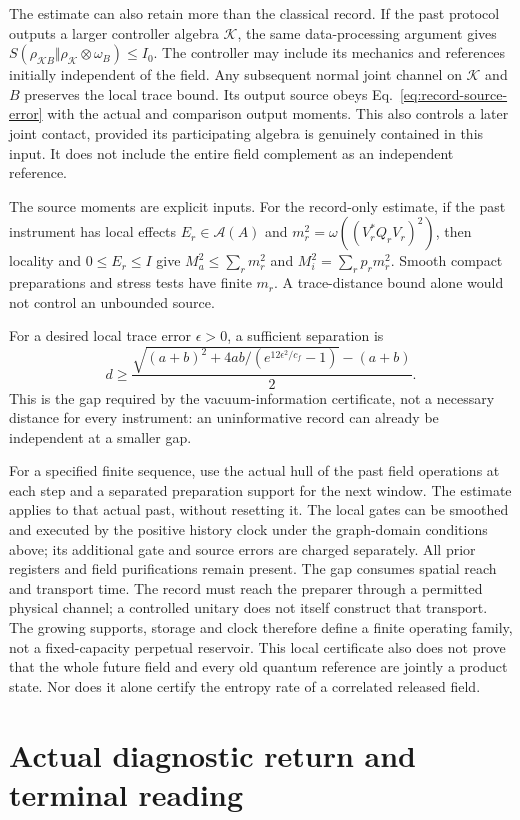 The estimate can also retain more than the classical record. If the past
protocol outputs a larger controller algebra $\mathcal K$, the same
data-processing argument gives
$S(\rho_{\mathcal KB}\Vert\rho_{\mathcal K}\otimes\omega_B)\le I_0$.
The controller may include its mechanics and references initially
independent of the field. Any subsequent normal joint channel on
$\mathcal K$ and $B$ preserves the local trace bound. Its output
source obeys Eq.~\eqref{eq:record-source-error} with the actual and
comparison output moments. This also controls a later joint contact,
provided its participating algebra is genuinely contained in this
input. It does not include the entire field complement as an
independent reference.

The source moments are explicit inputs. For the record-only estimate, if the past
instrument has local effects $E_r\in\mathcal A(A)$ and
$m_r^2=\omega((V_r^*Q_rV_r)^2)$, then locality and $0\le E_r\le I$
give $M_a^2\le\sum_r m_r^2$ and
$M_i^2=\sum_rp_rm_r^2$. Smooth compact preparations and stress tests
have finite $m_r$. A trace-distance bound alone would not control
an unbounded source.

For a desired local trace error $\epsilon>0$, a sufficient separation is
\[
 d\ge\frac{\sqrt{(a+b)^2+
          4ab/(e^{12\epsilon^2/c_f}-1)}-(a+b)}{2}.
\]
This is the gap required by the vacuum-information certificate,
not a necessary distance for every instrument: an uninformative
record can already be independent at a smaller gap.

For a specified finite sequence, use the actual hull of the past
field operations at each step and a separated preparation support
for the next window. The estimate applies to that actual past,
without resetting it. The local gates can be smoothed and executed
by the positive history clock under the graph-domain conditions
above; its additional gate and source errors are charged separately.
All prior registers and field purifications remain present.
The gap consumes spatial reach and transport time. The record must
reach the preparer through a permitted physical channel; a controlled
unitary does not itself construct that transport. The growing
supports, storage and clock therefore define a finite operating
family, not a fixed-capacity perpetual reservoir.
This local certificate also does not prove that the whole future
field and every old quantum reference are jointly a product state.
Nor does it alone certify the entropy rate of a correlated released field.


\section{Actual diagnostic return and terminal reading}
\label{app:diagnostic-proofs}

